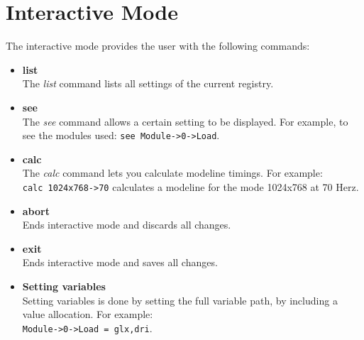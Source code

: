 \section{Interactive Mode}
The interactive mode provides the user with the following commands:
\begin{itemize}
\item  \textbf{list}\\
       The \textit{list} command lists all settings of the current registry.

\item  \textbf{see}\\
       The \textit{see} command allows a certain setting to be displayed. For
       example, to see the modules used: 
       \verb+see Module->0->Load+.

\item  \textbf{calc}\\
       The \textit{calc} command lets you calculate modeline timings. For
       example:\\
       \verb+calc 1024x768->70+ calculates a modeline for the mode
       1024x768 at 70 Herz.

\item  \textbf{abort}\\
       Ends interactive mode and discards all changes.

\item  \textbf{exit}\\
       Ends interactive mode and saves all changes.

\item  \textbf{Setting variables}\\
       Setting variables is done by setting the full variable path, by
       including a value allocation. For example:\\
       \verb+Module->0->Load = glx,dri+.
\end{itemize}

